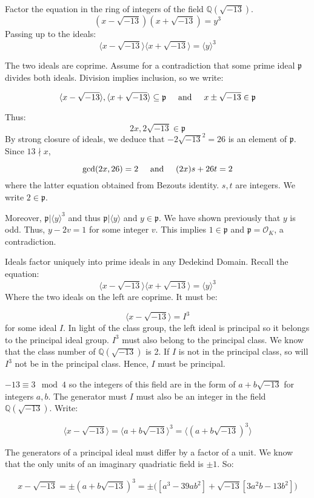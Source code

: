 \documentclass{article}
\def\contradiction{{\lightning}}
\newcommand{\textAnd}{
    \hspace{5mm}
    \textrm{and}
    \hspace{5mm}
}
\newcommand{\<}{{{
    \langle
}}}
\def\>{{{
    \rangle
}}}
\newcommand{\ringInt}{
    {\mathcal{O}}
}
\newcommand{\pideal}{
    {{\mathfrak{p}}}
}
\def\QQ{\mathbb{Q}}
\begin{document}
Factor the equation in the ring of integers of the field $\QQ(\sqrt{-13})$. 
\[
    (x-\sqrt{-13})(x+\sqrt{-13}) = y^3
\]
Passing up to the ideals:
\[
    \<x-\sqrt{-13}\>\<x+\sqrt{-13}\> = \<y\>^3
\]

The two ideals are coprime. Assume for a contradiction that 
some prime ideal $\pideal$ divides both ideals. Division implies 
inclusion, so we write:

\[
    \<x-\sqrt{-13}\>, \<x+\sqrt{-13}\> \subseteq \pideal
    \textAnd 
    x \pm \sqrt{-13} \in \pideal
\]

Thus:
\[
    2x, 2\sqrt{-13} \in \pideal
\]
By strong closure of ideals, we deduce that 
$-2\sqrt{-13}^2 = 26$ is an element of $\pideal$. Since 
$13 \nmid x$,

\[
    \gcd(2x, 26) = 2 \textAnd 
    (2x)s+26t = 2
\]
where the latter equation obtained from Bezouts identity. 
$s, t$ are integers. We write $2 \in \pideal$. 

Moreover, $\pideal | \<y\>^3$ and thus $\pideal | \<y\>$ 
and $y \in \pideal$. We have shown previously that $y$ is 
odd. Thus, $y - 2v = 1$ for some integer $v$. This implies 
$1 \in \pideal$ and $\pideal = \ringInt_K$, a contradiction. 
\contradiction

Ideals factor uniquely into prime ideals in any Dedekind Domain. 
Recall the equation:
\[
    \<x-\sqrt{-13}\>\<x+\sqrt{-13}\> = \<y\>^3
\]
Where the two ideals on the left are coprime. It must be:

\[
    \<x-\sqrt{-13}\> = I^3
\]
for some ideal $I$. In light of the class group, the left ideal 
is principal so it belongs to the principal ideal group. $I^3$ must 
also belong to the principal class. We know that the class number of 
$\QQ(\sqrt{-13})$ is 2. If $I$ is not in the principal class, so will 
$I^3$ not be in the principal class. Hence, $I$ must be principal. 

$-13 \equiv 3 \mod 4$ so the integers of this field are in the form 
of $a+b\sqrt{-13}$ for integers $a,b$. The generator must $I$ must 
also be an integer in the field $\QQ(\sqrt{-13})$. Write:

\[
    \<x-\sqrt{-13}\> = \<a+b\sqrt{-13}\>^3 
    = \<(a+b\sqrt{-13})^3\>
\]

The generators of a principal ideal must differ by a factor 
of a unit. We know that the only units of an imaginary quadriatic 
field is $\pm1$. So:

\[
    x-\sqrt{-13} = \pm (a+b\sqrt{-13})^3
    = \pm\bigg([a^3-39ab^2] + \sqrt{-13} [3a^2b -13b^2]\bigg)
\]
\end{document}
